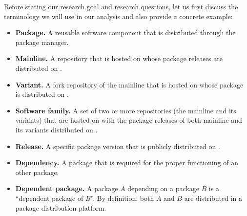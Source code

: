 Before stating our research goal and research questions, let us first discuss the terminology we will use in our analysis and also provide a concrete example: 

\begin{itemize}
    \item \textbf{Package.} A reusable software component that is distributed through the \np package manager.
    
    \item \textbf{Mainline.} A repository that is hosted on \gh 
    whose package releases are distributed on \np.

    \item \textbf{Variant.} A fork repository of the mainline that is hosted on \gh whose package is distributed on \np.

    \item \textbf{Software family.} A set of two or more repositories (the mainline and its variants) that are hosted on \gh with the package releases of both mainline and its variants distributed on \np.

    
    \item \textbf{Release.} A specific package version that is publicly distributed on \npm.

     \item \textbf{Dependency.} A package that is required for the proper functioning of an other package.

    \item \textbf{Dependent package.}  A package $A$ depending on a package $B$ is a ``dependent package of $B$''. By definition, both $A$ and $B$ are distributed in a package distribution platform. %
    

\end{itemize}
